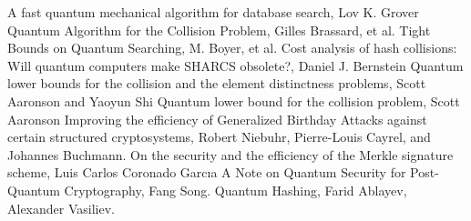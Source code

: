 \documentclass[10pt,a4paper]{article}
\begin{document}
\begin{thebibliography}{20}
 A fast quantum mechanical algorithm for database search, Lov K. Grover
 Quantum Algorithm for the Collision Problem, Gilles Brassard, et al.
 Tight Bounds on Quantum Searching, M. Boyer, et al.
 Cost analysis of hash collisions: Will quantum computers make SHARCS obsolete?, Daniel J. Bernstein
 Quantum lower bounds for the collision and the element distinctness problems, Scott Aaronson and Yaoyun Shi
 Quantum lower bound for the collision problem, Scott Aaronson
 Improving the efficiency of Generalized Birthday Attacks against certain structured cryptosystems, Robert Niebuhr, Pierre-Louis Cayrel, and Johannes Buchmann.
 On the security and the efficiency of the Merkle signature scheme, Luis Carlos Coronado Garcıa 
A Note on Quantum Security for Post-Quantum Cryptography, Fang Song.
  Quantum Hashing, Farid Ablayev, Alexander Vasiliev.
\end{thebibliography}
\end{document}
